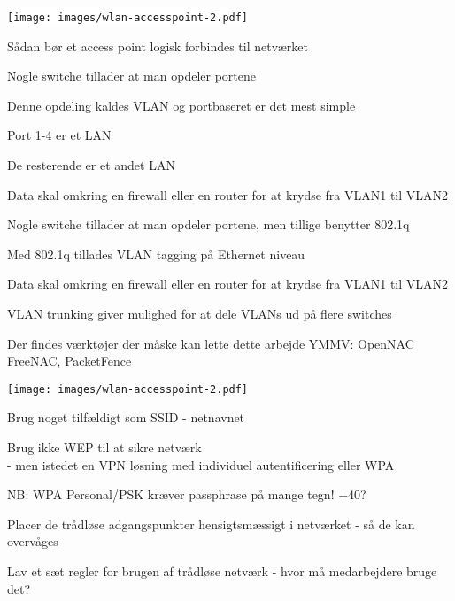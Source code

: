 \documentclass[20pt,landscape,a4paper,footrule]{foils}
\begin{document}

\begin{center}
\colorbox{white}{\texttt{[image: images/wlan-accesspoint-2.pdf]}}
\end{center}

\centerline{Sådan bør et access point logisk forbindes til netværket}






\begin{list2}
\item Nogle switche tillader at man opdeler portene
\item Denne opdeling kaldes VLAN og portbaseret er det mest simple
\item Port 1-4 er et LAN
\item De resterende er et andet LAN
\item Data skal omkring en firewall eller en router for at krydse fra VLAN1 til VLAN2
\end{list2}



\begin{list2}
\item Nogle switche tillader at man opdeler portene, men tillige benytter 802.1q
\item Med 802.1q tillades VLAN tagging på Ethernet niveau
\item Data skal omkring en firewall eller en router for at krydse fra VLAN1 til VLAN2
\item VLAN trunking giver mulighed for at dele VLANs ud på flere switches
\item Der findes værktøjer der måske kan lette dette arbejde YMMV: OpenNAC FreeNAC, PacketFence
\end{list2}




\begin{minipage}{10cm}
\texttt{[image: images/wlan-accesspoint-2.pdf]}
\end{minipage}
\begin{minipage}{\linewidth-10cm}
\begin{list2}
\item Brug noget tilfældigt som SSID - netnavnet
\item Brug ikke WEP til at sikre netværk\\
- men istedet en VPN løsning med individuel
  autentificering eller WPA
\item NB: WPA Personal/PSK kræver passphrase på mange tegn! +40?
\item Placer de trådløse adgangspunkter hensigtsmæssigt i netværket -
  så de kan overvåges
\item Lav et sæt regler for brugen af trådløse netværk - hvor må
  medarbejdere bruge det?
\end{list2}
\end{minipage}
\end{document}
